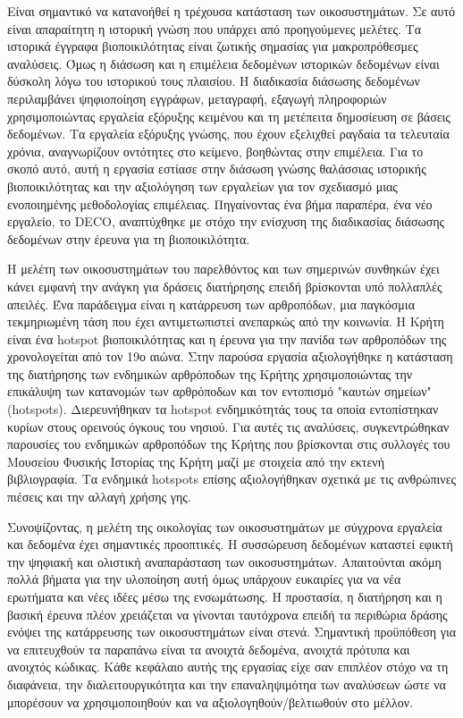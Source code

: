 \documentclass[11pt]{article}
\begin{document}
Είναι σημαντικό να κατανοήθεί η τρέχουσα κατάσταση των οικοσυστημάτων. Σε αυτό είναι
απαραίτητη η ιστορική γνώση που υπάρχει από προηγούμενες μελέτες.
Τα ιστορικά έγγραφα βιοποικιλότητας είναι ζωτικής σημασίας για
μακροπρόθεσμες αναλύσεις. Όμως η διάσωση και η επιμέλεια δεδομένων ιστορικών δεδομένων είναι δύσκολη λόγω του ιστορικού τους
πλαισίου. Η διαδικασία διάσωσης δεδομένων περιλαμβάνει ψηφιοποίηση εγγράφων, μεταγραφή, εξαγωγή πληροφοριών
χρησιμοποιώντας εργαλεία εξόρυξης κειμένου και τη μετέπειτα δημοσίευση σε βάσεις δεδομένων.
Τα εργαλεία εξόρυξης γνώσης, που έχουν εξελιχθεί ραγδαία τα τελευταία χρόνια,
αναγνωρίζουν οντότητες στο κείμενο, βοηθώντας στην επιμέλεια.
Για το σκοπό αυτό, αυτή η εργασία εστίασε στην διάσωση γνώσης θαλάσσιας ιστορικής βιοποικιλότητας και την
αξιολόγηση των εργαλείων για τον σχεδιασμό μιας ενοποιημένης μεθοδολογίας επιμέλειας. 
Πηγαίνοντας ένα βήμα παραπέρα, ένα νέο εργαλείο, το \textlatin{DECO}, αναπτύχθηκε
με στόχο την ενίσχυση της διαδικασίας διάσωσης δεδομένων στην έρευνα για τη βιοποικιλότητα.

Η μελέτη των οικοσυστημάτων του παρελθόντος και των σημερινών συνθηκών έχει κάνει εμφανή την ανάγκη για
δράσεις διατήρησης επειδή βρίσκονται υπό πολλαπλές απειλές.
Ένα παράδειγμα είναι η κατάρρευση των αρθροπόδων, μια παγκόσμια τεκμηριωμένη
τάση που έχει αντιμετωπιστεί ανεπαρκώς από την κοινωνία.
Η Κρήτη είναι ένα hotspot βιοποικιλότητας και η έρευνα για την πανίδα των αρθροπόδων της χρονολογείται από τον 19ο αιώνα.
Στην παρούσα εργασία αξιολογήθηκε η κατάσταση της διατήρησης των ενδημικών αρθρόποδων της Κρήτης χρησιμοποιώντας
την επικάλυψη των κατανομών των αρθρόποδων και τον εντοπισμό "καυτών σημείων" (hotspots).
Διερευνήθηκαν τα \textlatin{hotspot} ενδημικότητάς τους τα οποία εντοπίστηκαν κυρίων
στους ορεινούς όγκους του νησιού.
Για αυτές τις αναλύσεις, συγκεντρώθηκαν παρουσίες του ενδημικών αρθροπόδων της Κρήτης
που βρίσκονται στις συλλογές του Μουσείου Φυσικής Ιστορίας της
Κρήτη μαζί με στοιχεία από την εκτενή βιβλιογραφία.
Τα ενδημικά \textlatin{hotspots} επίσης αξιολογήθηκαν σχετικά με τις ανθρώπινες 
πιέσεις και την αλλαγή χρήσης γης.

Συνοψίζοντας, η μελέτη της οικολογίας των οικοσυστημάτων με σύγχρονα εργαλεία και δεδομένα
έχει σημαντικές προοπτικές. Η συσσώρευση δεδομένων καταστεί εφικτή την
ψηφιακή και ολιστική αναπαράσταση των οικοσυστημάτων. Απαιτούνται ακόμη πολλά βήματα
για την υλοποίηση αυτή όμως υπάρχουν ευκαιρίες για να νέα ερωτήματα και νέες ιδέες
μέσω της ενσωμάτωσης. Η προστασία, η διατήρηση και η βασική έρευνα πλέον χρειάζεται να 
γίνονται ταυτόχρονα επειδή τα περιθώρια δράσης ενόψει της κατάρρευσης των
οικοσυστημάτων είναι στενά.
Σημαντική προϋπόθεση για να επιτευχθούν τα παραπάνω είναι τα ανοιχτά δεδομένα,
ανοιχτά πρότυπα και ανοιχτός κώδικας. Κάθε κεφάλαιο αυτής της εργασίας είχε σαν 
επιπλέον στόχο να τη διαφάνεια, την διαλειτουργικότητα και την επαναληψιμότηα 
των αναλύσεων ώστε να μπορέσουν να χρησιμοποιηθούν και να αξιολογηθούν/βελτιωθούν στο μέλλον.
\end{document}
